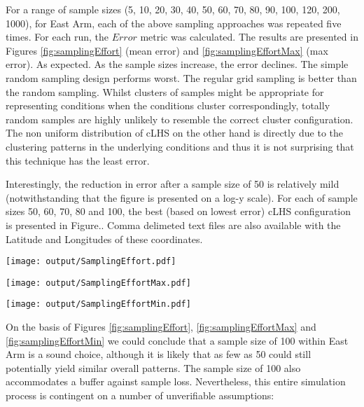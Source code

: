 \documentclass[a4paper]{article}
\let\origfigure=\figure
\let\endorigfigure=\endfigure
\renewenvironment{figure}[1][]{%
   \origfigure[H]
}{%
   \endorigfigure
}
\begin{document}
For a range of sample sizes (5, 10, 20, 30, 40, 50, 60, 70, 80, 90, 100,
120, 200, 1000), for East Arm, each of the above sampling approaches was
repeated five times. For each run, the \(Error\) metric was calculated.
The results are presented in Figures \ref{fig:samplingEffort} (mean
error) and \ref{fig:samplingEffortMax} (max error). As expected. As the
sample sizes increase, the error declines. The simple random sampling
design performs worst. The regular grid sampling is better than the
random sampling. Whilst clusters of samples might be appropriate for
representing conditions when the conditions cluster correspondingly,
totally random samples are highly unlikely to resemble the correct
cluster configuration. The non uniform distribution of cLHS on the other
hand is directly due to the clustering patterns in the underlying
conditions and thus it is not surprising that this technique has the
least error.

Interestingly, the reduction in error after a sample size of 50 is
relatively mild (notwithstanding that the figure is presented on a log-y
scale). For each of sample sizes 50, 60, 70, 80 and 100, the best (based
on lowest error) cLHS configuration is presented in Figure.. Comma
delimeted text files are also available with the Latitude and Longitudes
of these coordinates.

\begin{figure}
\centering\scriptsize
\texttt{[image: output/SamplingEffort.pdf]}
\caption{Comparison of the mean Error conditional on sample size and
sampling method for the East Arm\label{fig:samplingEffort}}
\end{figure}

\begin{figure}
\centering\scriptsize
\texttt{[image: output/SamplingEffortMax.pdf]}
\caption{Comparison of the maximum Error conditional on sample size and
sampling method for the East Arm\label{fig:samplingEffortMax}}
\end{figure}

\begin{figure}
\centering\scriptsize
\texttt{[image: output/SamplingEffortMin.pdf]}
\caption{Comparison of the minimum Error conditional on sample size and
sampling method for the East Arm\label{fig:samplingEffortMin}}
\end{figure}

On the basis of Figures \ref{fig:samplingEffort},
\ref{fig:samplingEffortMax} and \ref{fig:samplingEffortMin} we could
conclude that a sample size of 100 within East Arm is a sound choice,
although it is likely that as few as 50 could still potentially yield
similar overall patterns. The sample size of 100 also accommodates a
buffer against sample loss. Nevertheless, this entire simulation process
is contingent on a number of unverifiable assumptions:
\end{document}
